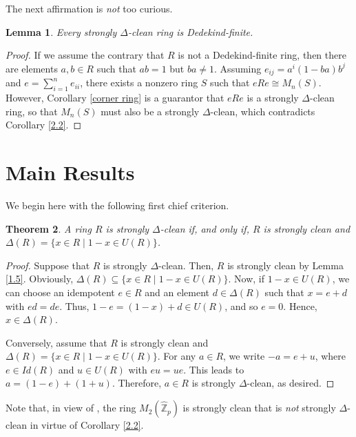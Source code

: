 \documentclass[12pt]{amsart}
\newtheorem{theorem}{Theorem}[section]
\newtheorem{lemma}[theorem]{Lemma}
\theoremstyle{definition}
\begin{document}
\medskip

The next affirmation is {\it not} too curious.

\begin{lemma} \label{dedkind finite}
Every strongly $\Delta$-clean ring is Dedekind-finite.
\end{lemma}

\begin{proof}
If we assume the contrary that $R$ is not a Dedekind-finite ring, then there are elements $a, b \in R$ such that $ab = 1$ but $ba \neq 1$. Assuming $e_{ij} = a^i(1-ba)b^j$ and $e =\sum_{i=1}^{n}e_{ii}$, there exists a nonzero ring $S$ such that $eRe \cong M_n(S)$. However, Corollary \ref{corner ring} is a guarantor that $eRe$ is a strongly $\Delta$-clean ring, so that $M_n(S)$ must also be a strongly $\Delta$-clean, which contradicts Corollary \ref{2.2}.
\end{proof}

\section{Main Results}

We begin here with the following first chief criterion.

\begin{theorem}\label{1}
A ring $R$ is strongly $\Delta$-clean if, and only if, $R$ is strongly clean and $\Delta(R) = \{ x \in R \mid 1 - x \in U(R) \}$.
\end{theorem}

\begin{proof}
Suppose that $R$ is strongly $\Delta$-clean. Then, $R$ is strongly clean by Lemma \ref {1.5}. Obviously, $\Delta(R)\subseteq \{ x \in R \mid 1 - x \in U(R) \}$. Now, if $1-x\in U(R)$, we can choose an idempotent $e\in R$ and an element $d\in\Delta(R)$ such that $x=e+d$ with $ed=de$. Thus, $1-e=(1-x)+d\in U(R)$, and so $e=0$. Hence, $x\in \Delta(R)$.

Conversely, assume that $R$ is strongly clean and $\Delta(R) = \{ x \in R \mid 1 - x \in U(R) \}$. For any $a\in R$, we write $-a=e+u$, where $e\in Id(R)$ and $u\in U(R)$ with $eu=ue$. This leads to $a=(1-e)+(1+u)$. Therefore, $a\in R$ is strongly $\Delta$-clean, as desired.
\end{proof}

Note that, in view of \cite[Theorem 2.4]{cyz}, the ring $M_{2}(\hat{\mathbb{Z}}_{p})$ is strongly clean that is {\it not} strongly $\Delta$-clean in virtue of Corollary \ref {2.2}.
\end{document}
